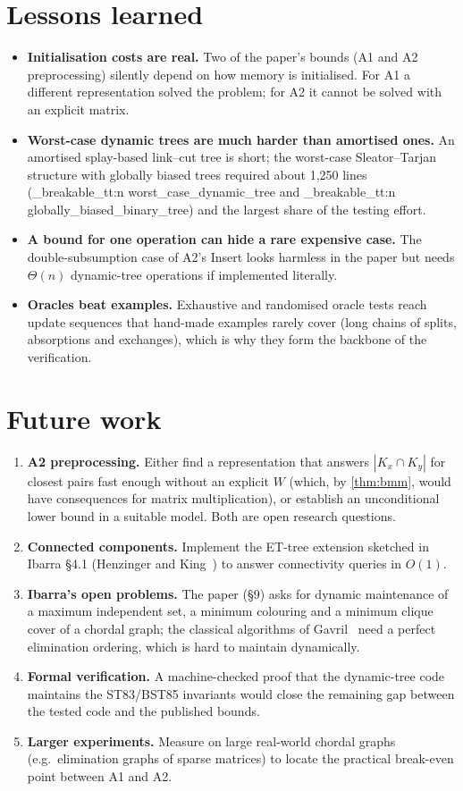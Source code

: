 \documentclass[11pt,a4paper,oneside]{report}
\theoremstyle{plain}
\theoremstyle{definition}
\theoremstyle{remark}
\newcommand{\op}[1]{\textsf{#1}}
\DeclareRobustCommand{\file}[1]{\mtp_breakable_tt:n {#1}}
\begin{document}
\section{Lessons learned}
\begin{itemize}
\item \textbf{Initialisation costs are real.} Two of the paper's bounds (A1 and A2
  preprocessing) silently depend on how memory is initialised. For A1 a different
  representation solved the problem; for A2 it cannot be solved with an explicit matrix.
\item \textbf{Worst-case dynamic trees are much harder than amortised ones.} An amortised
  splay-based link--cut tree is short; the worst-case Sleator--Tarjan structure with globally
  biased trees required about 1{,}250 lines (\file{worst_case_dynamic_tree} and
  \file{globally_biased_binary_tree}) and the largest share of the testing effort.
\item \textbf{A bound for one operation can hide a rare expensive case.} The double-subsumption
  case of A2's \op{Insert} looks harmless in the paper but needs \(\Theta(n)\) dynamic-tree
  operations if implemented literally.
\item \textbf{Oracles beat examples.} Exhaustive and randomised oracle tests reach update
  sequences that hand-made examples rarely cover (long chains of splits, absorptions and
  exchanges), which is why they form the backbone of the verification.
\end{itemize}

\section{Future work}
\begin{enumerate}
\item \textbf{A2 preprocessing.} Either find a representation that answers
  \(|K_x\cap K_y|\) for closest pairs fast enough without an explicit \(W\) (which, by
  \cref{thm:bmm}, would have consequences for matrix multiplication), or establish an
  unconditional lower bound in a suitable model. Both are open research questions.
\item \textbf{Connected components.} Implement the ET-tree extension sketched in Ibarra \S4.1
  (Henzinger and King~\cite{henzinger1999}) to answer connectivity queries in \(O(1)\).
\item \textbf{Ibarra's open problems.} The paper (\S9) asks for dynamic maintenance of a
  maximum independent set, a minimum colouring and a minimum clique cover of a chordal graph;
  the classical algorithms of Gavril~\cite{gavril1972} need a perfect elimination ordering,
  which is hard to maintain dynamically.
\item \textbf{Formal verification.} A machine-checked proof that the dynamic-tree code
  maintains the ST83/BST85 invariants would close the remaining gap between the tested code and
  the published bounds.
\item \textbf{Larger experiments.} Measure on large real-world chordal graphs (e.g.\ elimination
  graphs of sparse matrices) to locate the practical break-even point between A1 and A2.
\end{enumerate}
\end{document}
